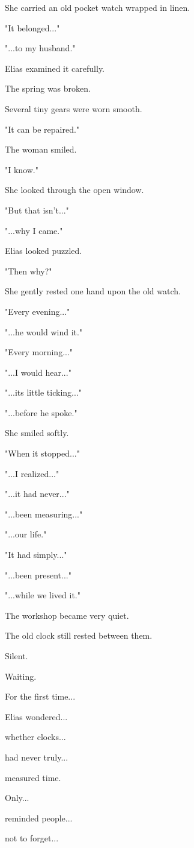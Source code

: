\documentclass[12pt,openany]{book}
\begin{document}
She carried an old pocket watch wrapped in linen.

"It belonged..."

"...to my husband."

Elias examined it carefully.

The spring was broken.

Several tiny gears were worn smooth.

"It can be repaired."

The woman smiled.

"I know."

She looked through the open window.

"But that isn't..."

"...why I came."

Elias looked puzzled.

"Then why?"

She gently rested one hand upon the old watch.

"Every evening..."

"...he would wind it."

"Every morning..."

"...I would hear..."

"...its little ticking..."

"...before he spoke."

She smiled softly.

"When it stopped..."

"...I realized..."

"...it had never..."

"...been measuring..."

"...our life."

"It had simply..."

"...been present..."

"...while we lived it."

The workshop became very quiet.

The old clock still rested between them.

Silent.

Waiting.

For the first time...

Elias wondered...

whether clocks...

had never truly...

measured time.

Only...

reminded people...

not to forget...
\end{document}
